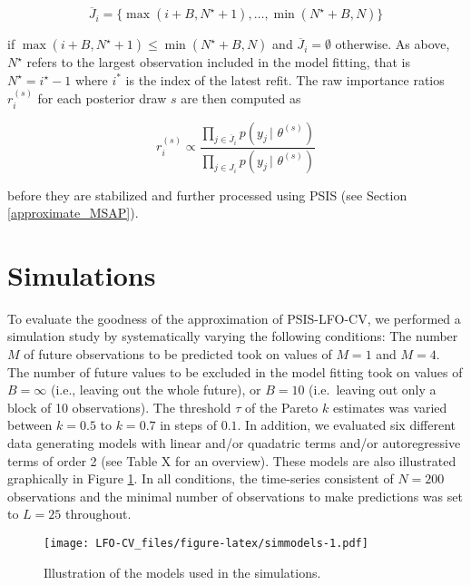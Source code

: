 \documentclass[american,]{article}
\begin{document}
\begin{equation}
\overline{J}_i = \{ \max(i + B, N^\star + 1), \ldots, \min(N^\star + B, N) \}
\end{equation}

if \(\max(i + B, N^\star + 1) \leq \min(N^\star + B, N)\) and
\(\overline{J}_i = \emptyset\) otherwise. As above, \(N^\star\) refers to the
largest observation included in the model fitting, that is
\(N^\star = i^\star - 1\) where \(i^*\) is the index of the latest refit. The raw
importance ratios \(r_i^{(s)}\) for each posterior draw \(s\) are then computed as

\begin{equation}
r_i^{(s)} \propto \frac{\prod_{j \in \overline{J}_i} p(y_j \,|\, \,\theta^{(s)})}
{\prod_{j \in J_i} p(y_j \,|\, \,\theta^{(s)})}
\end{equation}

before they are stabilized and further processed using PSIS (see Section
\ref{approximate_MSAP}).

\hypertarget{simulations}{%
\section{Simulations}\label{simulations}}

To evaluate the goodness of the approximation of PSIS-LFO-CV,
we performed a simulation study by systematically varying the following
conditions: The number \(M\) of future observations to be predicted took on
values of \(M = 1\) and \(M = 4\). The number of future values to be excluded in the model
fitting took on values of \(B = \infty\) (i.e., leaving out the whole future), or
\(B = 10\) (i.e.~leaving out only a block of 10 observations).
The threshold \(\tau\) of the Pareto \(k\) estimates was varied between
\(k = 0.5\) to \(k = 0.7\) in steps of \(0.1\). In addition, we evaluated six
different data generating models with linear and/or quadatric terms and/or
autoregressive terms of order 2 (see Table X for an overview). These models are
also illustrated graphically in Figure \ref{fig:simmodels}. In all conditions,
the time-series consistent of \(N = 200\) observations and the minimal number
of observations to make predictions was set to \(L = 25\) throughout.

\begin{figure}
\centering
\texttt{[image: LFO-CV\_files/figure-latex/simmodels-1.pdf]}
\caption{\label{fig:simmodels}Illustration of the models used in the simulations.}
\end{figure}
\end{document}
